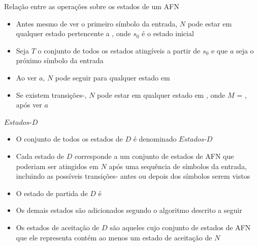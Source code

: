 \begin{frame}[fragile]{Relação entre as operações sobre os estados de um AFN}

    \begin{itemize}
        \item Antes mesmo de ver o primeiro símbolo da entrada, $N$ pode estar em qualquer estado pertencente a , onde $s_0$
            é o estado inicial

        \item Seja $T$ o conjunto de todos os estados atingíveis a partir de $s_0$ e que $a$ seja o próximo símbolo da entrada

        \item Ao ver $a$, $N$ pode seguir para qualquer estado em 

        \item Se existem transições-, $N$ pode estar em qualquer estado em , onde $M$ = , após ver $a$

    \end{itemize}

\end{frame}

\begin{frame}[fragile]{$Estados$-$D$}

    \begin{itemize}
        \item O conjunto de todos os estados de $D$ é denominado $Estados$-$D$

        \item Cada estado de $D$ corresponde a um conjunto de estados de AFN que poderiam ser atingidos em $N$ após uma sequência de símbolos da entrada, incluindo
            as possíveis transições- antes ou depois dos símbolos serem vistos

        \item O estado de partida de $D$ é 

        \item Os demais estados são adicionados segundo o algoritmo descrito a seguir

        \item Os estados de aceitação de $D$ são aqueles cujo conjunto de estados de AFN que ele representa contém ao menos um estado de aceitação de $N$
    \end{itemize}

\end{frame}

